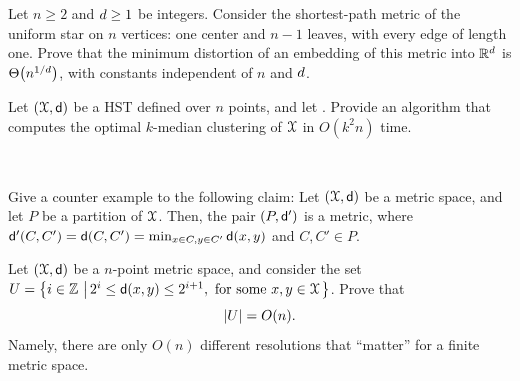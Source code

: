\begin{exercise}
    Let $n \geq 2$ and $d \geq 1$ be integers. Consider the
    shortest-path metric of the uniform star on $n$ vertices: one
    center and $n-1$ leaves, with every edge of length one. Prove that
    the minimum distortion of an embedding of this metric into
    $\mathbb{R}^d$ is $\Theta\pth{n^{1/\hdim}}$, with constants
    independent of $n$ and $d$.

\end{exercise}

\begin{exercise}
    Let $(\FMS,\DistChar)$ be a HST defined over $n$ points, and let
    .
    Provide an algorithm that computes the optimal
    $k$-median clustering of $\FMS$ in $O(k^2 n )$ time.
    
\end{exercise}


\begin{exercise} ~

    \begin{compactenuma}
        \item Give a counter example to the following claim: Let
        $(\FMS,\DistChar)$ be a metric space, and let $P$ be a
        partition of $\FMS$. Then, the pair $(P,\mathsf{d}')$ is a
        metric, where
        $\mathsf{d}'(C, C') = \mathsf{d}(C, C')=\min_{x \in C, y \in C'}
        \mathsf{d}(x,y)$ and $C, C' \in P$.
        
        \item Let $(\FMS,\DistChar)$ be a $n$-point metric space, and
        consider the set
        $U = \brc{ i\in\mathbb{Z} \sep{ 2^i \leq \DistChar(x,y) \leq 2^{i+1},
              \text{ for some } x,y \in \FMS}}$. Prove that
        \[
        \left| {U} \right| = O(n).
        \]
        Namely, there are only $O(n)$ different
        resolutions that ``matter'' for a finite metric space.
    \end{compactenuma}
\end{exercise}


